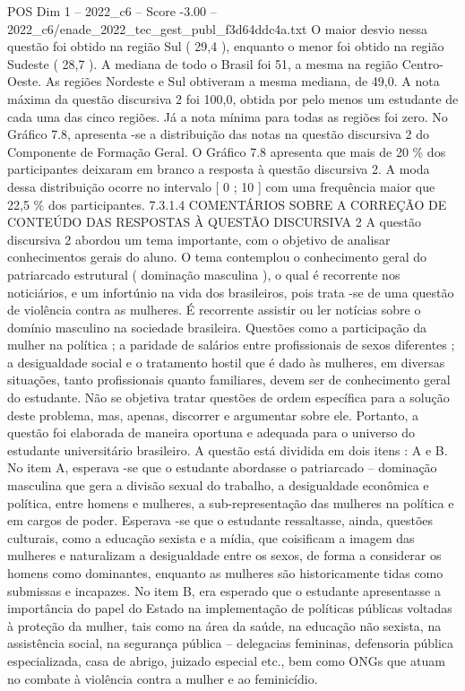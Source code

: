\begin{textsample}{POS Dim 1 – 2022\_c6 – Score -3.00 – 2022\_c6/enade\_2022\_tec\_gest\_publ\_f3d64ddc4a.txt}
O maior desvio nessa questão foi obtido na região Sul ( 29,4 ), enquanto o menor foi obtido na região Sudeste ( 28,7 ).
A mediana de todo o Brasil foi 51, a mesma na região Centro-Oeste.
As regiões Nordeste e Sul obtiveram a mesma mediana, de 49,0.
A nota máxima da questão discursiva 2 foi 100,0, obtida por pelo menos um estudante de cada uma das cinco regiões.
Já a nota mínima para todas as regiões foi zero.
No Gráfico 7.8, apresenta -se a distribuição das notas na questão discursiva 2 do Componente de Formação Geral.
O Gráfico 7.8 apresenta que mais de 20 \% dos participantes deixaram em branco a resposta à questão discursiva 2.
A moda dessa distribuição ocorre no intervalo [ 0 ; 10 ] com uma frequência maior que 22,5 \% dos participantes. 7.3.1.4 COMENTÁRIOS SOBRE A CORREÇÃO DE CONTEÚDO DAS RESPOSTAS À QUESTÃO DISCURSIVA 2 A questão discursiva 2 abordou um tema importante, com o objetivo de analisar conhecimentos gerais do aluno.
O tema contemplou o conhecimento geral do patriarcado estrutural ( dominação masculina ), o qual é recorrente nos noticiários, e um infortúnio na vida dos brasileiros, pois trata -se de uma questão de violência contra as mulheres.
É recorrente assistir ou ler notícias sobre o domínio masculino na sociedade brasileira.
Questões como a participação da mulher na política ; a paridade de salários entre profissionais de sexos diferentes ; a desigualdade social e o tratamento hostil que é dado às mulheres, em diversas situações, tanto profissionais quanto familiares, devem ser de conhecimento geral do estudante.
Não se objetiva tratar questões de ordem específica para a solução deste problema, mas, apenas, discorrer e argumentar sobre ele.
Portanto, a questão foi elaborada de maneira oportuna e adequada para o universo do estudante universitário brasileiro.
A questão está dividida em dois itens : A e B.
No item A, esperava -se que o estudante abordasse o patriarcado – dominação masculina que gera a divisão sexual do trabalho, a desigualdade econômica e política, entre homens e mulheres, a sub-representação das mulheres na política e em cargos de poder.
Esperava -se que o estudante ressaltasse, ainda, questões culturais, como a educação sexista e a mídia, que coisificam a imagem das mulheres e naturalizam a desigualdade entre os sexos, de forma a considerar os homens como dominantes, enquanto as mulheres são historicamente tidas como submissas e incapazes.
No item B, era esperado que o estudante apresentasse a importância do papel do Estado na implementação de políticas públicas voltadas à proteção da mulher, tais como na área da saúde, na educação não sexista, na assistência social, na segurança pública – delegacias femininas, defensoria pública especializada, casa de abrigo, juizado especial etc., bem como ONGs que atuam no combate à violência contra a mulher e ao feminicídio.

\end{textsample}
